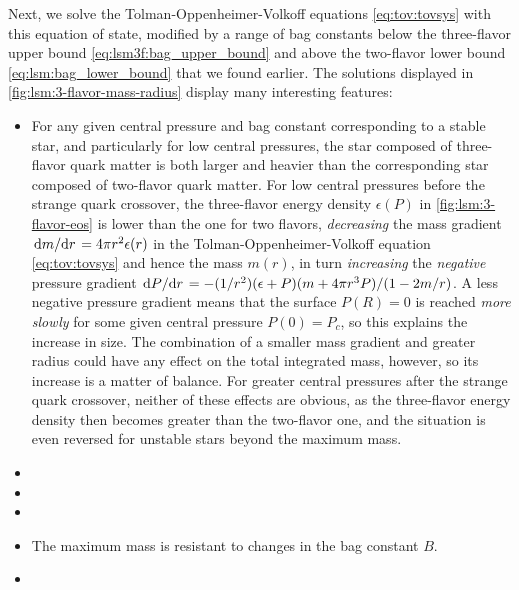 Next, we solve the Tolman-Oppenheimer-Volkoff equations \eqref{eq:tov:tovsys} with this equation of state,
modified by a range of bag constants below the three-flavor upper bound \eqref{eq:lsm3f:bag_upper_bound} and above the two-flavor lower bound \eqref{eq:lsm:bag_lower_bound} that we found earlier.
The solutions displayed in \cref{fig:lsm:3-flavor-mass-radius} display many interesting features:
\begin{itemize}
\item For any given central pressure and bag constant corresponding to a stable star, and particularly for low central pressures,
      the star composed of three-flavor quark matter is both larger and heavier than the corresponding star composed of two-flavor quark matter.
      For low central pressures before the strange quark crossover,
      the three-flavor energy density $\epsilon(P)$ in \cref{fig:lsm:3-flavor-eos} is lower than the one for two flavors,
      \emph{decreasing} the mass gradient $\odv{m}/{r} = 4 \pi r^2 \epsilon(r)$ in the Tolman-Oppenheimer-Volkoff equation \eqref{eq:tov:tovsys} and hence the mass $m(r)$,
      in turn \emph{increasing} the \emph{negative} pressure gradient $\odv{P}/{r} = -(1/r^2) (\epsilon+P) (m + 4 \pi r^3 P) / (1 - 2m/r)$.
      A less negative pressure gradient means that the surface $P(R)=0$ is reached \emph{more slowly} for some given central pressure $P(0)=P_c$, so this explains the increase in size.
      The combination of a smaller mass gradient and greater radius could have any effect on the total integrated mass, however, so its increase is a matter of balance.
      For greater central pressures after the strange quark crossover, neither of these effects are obvious, as the three-flavor energy density then becomes greater than the two-flavor one,
      and the situation is even reversed for unstable stars beyond the maximum mass.
\item {}
\item {}
\item {}
\item The maximum mass is resistant to changes in the bag constant $B$. 
\item {}
\end{itemize}




